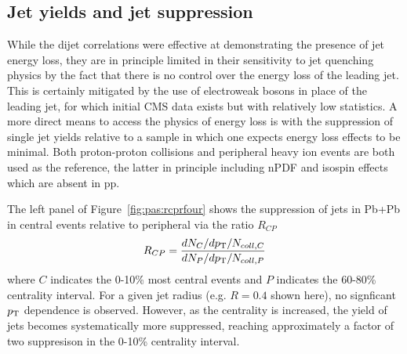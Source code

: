

\subsection{Jet yields and jet suppression}

While the dijet correlations were effective at demonstrating the presence of jet energy loss, 
they are in principle limited in their sensitivity to jet quenching physics by the fact that
there is no control over the energy loss of the leading jet.
This is certainly mitigated by the use of electroweak bosons in place of the leading jet,
for which initial CMS data exists but with relatively low statistics.
A more direct means to access the physics of energy loss is with the suppression of single
jet yields relative to a sample in which one expects energy loss effects to be minimal.
Both proton-proton collisions and peripheral heavy ion events are both used as the reference,
the latter in principle including nPDF and isospin effects which are absent in pp.

The left panel of Figure~\ref{fig:pas:rcprfour} shows the suppression of jets in Pb+Pb
in central events relative to peripheral via the ratio $R_{CP}$~\cite{Aad:2012is}
\begin{equation}
R_{CP} = \frac{dN_{C}/d\mbox{$p_{\mathrm{T}}$} / N_{coll,C}} {dN_{P}/d\mbox{$p_{\mathrm{T}}$} / N_{coll,P}}
\end{equation}
where $C$ indicates the 0-10\% most central events and $P$ indicates the 60-80\% centrality interval.
For a given jet radius (e.g. $R=0.4$ shown here), no signficant $\mbox{$p_{\mathrm{T}}$}$ dependence is observed.
However, as the centrality is increased, the yield of jets becomes systematically more suppressed,
reaching approximately a factor of two suppresison in the 0-10\% centrality interval.

